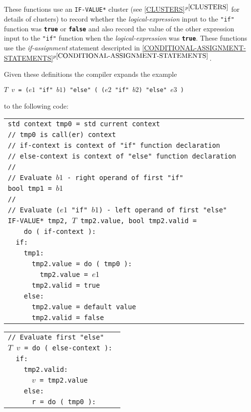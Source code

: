 \documentclass[12pt]{article}
\newcommand{\TT}[1]{{\tt \bfseries #1}}
\newcommand{\itemref}[1]{\ref{#1}$^{p\pageref{#1}}$}
\newenvironment{indpar}[1][0.3in]%
	{\begin{list}{}%
		     {\setlength{\itemsep}{0in}%
		      \setlength{\topsep}{0in}%
		      \setlength{\parsep}{1ex}%
		      \setlength{\labelwidth}{#1}%
		      \setlength{\leftmargin}{#1}%
		      \addtolength{\leftmargin}{\labelsep}}%
	 \item}%
	{\end{list}}
\begin{document}
These functions use an {\tt *IF-VALUE*} cluster (see
\itemref{CLUSTERS} for details of clusters) to record
whether the {\em logical-expression} input to the {\tt "if"}
function was \TT{true} or \TT{false} and also record
the value of the other expression input to the {\tt "if"}
function when the {\em logical-expression} was \TT{true}.
These functions use the {\em if-assignment} statement
descripted in \itemref{CONDITIONAL-ASSIGNMENT-STATEMENTS}.

Given these definitions the compiler expands the example
\begin{center}\label{IF-ELSE-EXAMPLE}
\tt $T$ $v$ = ($e1$ "if" $b1$) "else" ( ($e2$ "if" $b2$) "else" $e3$ )
\end{center}

to the following code:

\begin{indpar}
\begin{tabular}{l}
\tt std context tmp0 = std current context \\
\tt // tmp0 is call(er) context \\
\tt // if-context is context of "if" function declaration \\
\tt // else-context is context of "else" function declaration \\
\tt // \\
\tt // Evaluate $b1$ - right operand of first "if"\\
\tt bool tmp1 = $b1$ \\
\tt // \\
\tt // Evaluate ($e1$ "if" $b1$) - left operand of first "else" \\
\tt *IF-VALUE* tmp2, $T$ tmp2.value, bool tmp2.valid = \\
\tt ~~~~do ( if-context ): \\
\tt ~~if: \\
\tt ~~~~tmp1: \\
\tt ~~~~~~tmp2.value = do ( tmp0 ): \\
\tt ~~~~~~~~tmp2.value = $e1$ \\
\tt ~~~~~~tmp2.valid = true \\
\tt ~~~~else: \\
\tt ~~~~~~tmp2.value = default value \\
\tt ~~~~~~tmp2.valid = false \\
\end{tabular}

\begin{tabular}{l}
\tt // Evaluate first "else" \\
\tt $T$ $v$ = do ( else-context ): \\
\tt ~~if: \\
\tt ~~~~tmp2.valid: \\
\tt ~~~~~~$v$ = tmp2.value \\
\tt ~~~~else: \\
\tt ~~~~~~r = do ( tmp0 ): \\
\end{tabular}


\end{indpar}
\end{document}
